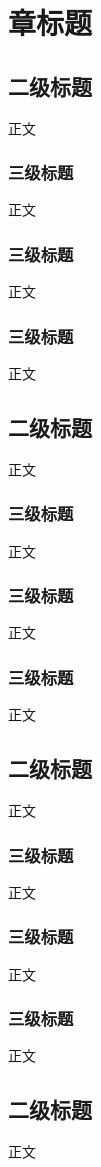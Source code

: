 \chapter{章标题}

\section{二级标题}
正文

\subsection{三级标题}
正文

\subsection{三级标题}
正文
\subsection{三级标题}
正文
\section{二级标题}
正文

\subsection{三级标题}
正文

\subsection{三级标题}
正文
\subsection{三级标题}
正文

\section{二级标题}
正文

\subsection{三级标题}
正文

\subsection{三级标题}
正文

\subsection{三级标题}
正文

\section{二级标题}
正文